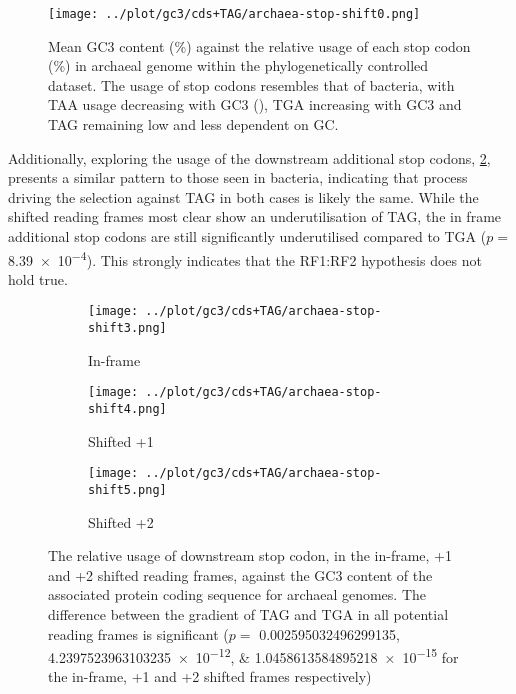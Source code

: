 \documentclass[../main.tex]{subfile}
\begin{document}
        \begin{figure}[H]
            \centering
            \texttt{[image: ../plot/gc3/cds+TAG/archaea-stop-shift0.png]}
            \caption{%
                Mean GC3 content (\%) against the relative usage of each stop codon (\%) in archaeal genome within the phylogenetically controlled dataset. The usage of stop codons resembles that of bacteria, with TAA usage decreasing with GC3 (), TGA increasing with GC3 and TAG remaining low and less dependent on GC.
            }
            \label{fig:results/stopUsage/archaea/protein}
        \end{figure}

        Additionally, exploring the usage of the downstream additional stop codons, \cref{fig:results/archaea/protein/shifted}, presents a similar pattern to those seen in bacteria, indicating that process driving the selection against TAG in both cases is likely the same. While the shifted reading frames most clear show an underutilisation of TAG, the in frame additional stop codons are still significantly underutilised compared to TGA ($p=$ \num{8.39e-4}). This strongly indicates that the RF1:RF2 hypothesis does not hold true.

        \begin{figure}[H]
            \centering
            \begin{subfigure}{.45\textwidth}
                \texttt{[image: ../plot/gc3/cds+TAG/archaea-stop-shift3.png]}
                \caption{In-frame}
            \end{subfigure}
            \begin{subfigure}{.45\textwidth}
                \texttt{[image: ../plot/gc3/cds+TAG/archaea-stop-shift4.png]}
                \caption{Shifted +1}
            \end{subfigure}
            \begin{subfigure}{.45\textwidth}
                \texttt{[image: ../plot/gc3/cds+TAG/archaea-stop-shift5.png]}
                \caption{Shifted +2}
            \end{subfigure}

            \caption{%
                The relative usage of downstream stop codon, in the in-frame, +1 and +2 shifted reading frames, against the GC3 content of the associated protein coding sequence for archaeal genomes.
                The difference between the gradient of TAG and TGA in all potential reading frames is significant ($p=$ \numlist[scientific-notation = true, round-mode=figures, round-precision=2]{0.002595032496299135;4.2397523963103235e-12;1.0458613584895218e-15} for the in-frame, +1 and +2 shifted frames respectively)
            }
            \label{fig:results/archaea/protein/shifted}
        \end{figure}
\end{document}
